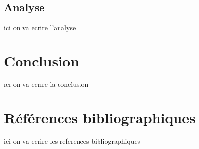 \documentclass {article}
\begin{document}
\subsection {Analyse}\label{analyse}
ici on va ecrire l'analyse

\section {Conclusion}
ici on va ecrire la conclusion

\section {Références bibliographiques}
ici on va ecrire les references bibliographiques
\end{document}
